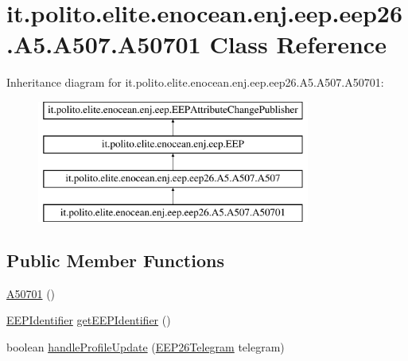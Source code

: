 \hypertarget{classit_1_1polito_1_1elite_1_1enocean_1_1enj_1_1eep_1_1eep26_1_1_a5_1_1_a507_1_1_a50701}{}\section{it.\+polito.\+elite.\+enocean.\+enj.\+eep.\+eep26.\+A5.\+A507.\+A50701 Class Reference}
\label{classit_1_1polito_1_1elite_1_1enocean_1_1enj_1_1eep_1_1eep26_1_1_a5_1_1_a507_1_1_a50701}
Inheritance diagram for it.\+polito.\+elite.\+enocean.\+enj.\+eep.\+eep26.\+A5.\+A507.\+A50701\+:\begin{figure}[H]
\begin{center}
\leavevmode
\includegraphics[height=4.000000cm]{classit_1_1polito_1_1elite_1_1enocean_1_1enj_1_1eep_1_1eep26_1_1_a5_1_1_a507_1_1_a50701}
\end{center}
\end{figure}
\subsection*{Public Member Functions}
\begin{DoxyCompactItemize}
\item 
\hyperlink{classit_1_1polito_1_1elite_1_1enocean_1_1enj_1_1eep_1_1eep26_1_1_a5_1_1_a507_1_1_a50701_a0413444217671d11f7b39b3fafeeffdb}{A50701} ()
\item 
\hyperlink{classit_1_1polito_1_1elite_1_1enocean_1_1enj_1_1eep_1_1_e_e_p_identifier}{E\+E\+P\+Identifier} \hyperlink{classit_1_1polito_1_1elite_1_1enocean_1_1enj_1_1eep_1_1eep26_1_1_a5_1_1_a507_1_1_a50701_a1f4b9c054c5f7924944cc21f0790a2a6}{get\+E\+E\+P\+Identifier} ()
\item 
boolean \hyperlink{classit_1_1polito_1_1elite_1_1enocean_1_1enj_1_1eep_1_1eep26_1_1_a5_1_1_a507_1_1_a50701_a0f2f57646a0e8d9d355717d6e08a966f}{handle\+Profile\+Update} (\hyperlink{classit_1_1polito_1_1elite_1_1enocean_1_1enj_1_1eep_1_1eep26_1_1telegram_1_1_e_e_p26_telegram}{E\+E\+P26\+Telegram} telegram)
\end{DoxyCompactItemize}
